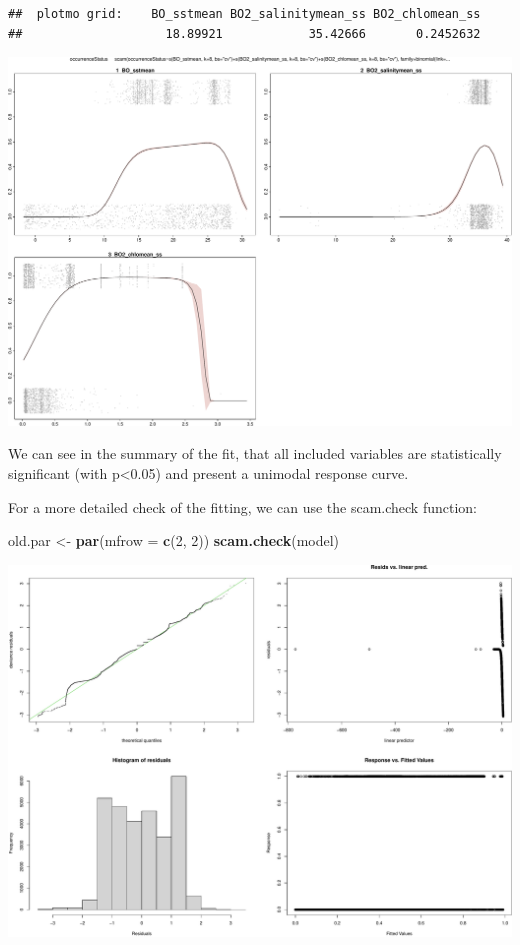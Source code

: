 \documentclass[
]{book}
\newenvironment{Shaded}{\begin{snugshade}}{\end{snugshade}}
\newcommand{\AttributeTok}[1]{\textcolor[rgb]{0.13,0.29,0.53}{#1}}
\newcommand{\DecValTok}[1]{\textcolor[rgb]{0.00,0.00,0.81}{#1}}
\newcommand{\FunctionTok}[1]{\textcolor[rgb]{0.13,0.29,0.53}{\textbf{#1}}}
\newcommand{\NormalTok}[1]{#1}
\newcommand{\OtherTok}[1]{\textcolor[rgb]{0.56,0.35,0.01}{#1}}
\begin{document}
\begin{verbatim}
##  plotmo grid:    BO_sstmean BO2_salinitymean_ss BO2_chlomean_ss
##                    18.89921            35.42666       0.2452632
\end{verbatim}

\includegraphics{_main_files/figure-latex/unnamed-chunk-64-1.pdf}

We can see in the summary of the fit, that all included variables are statistically significant (with p\textless0.05) and present a unimodal response curve.

For a more detailed check of the fitting, we can use the scam.check function:

\begin{Shaded}
\begin{Highlighting}[]
\NormalTok{old.par }\OtherTok{\textless{}{-}} \FunctionTok{par}\NormalTok{(}\AttributeTok{mfrow =} \FunctionTok{c}\NormalTok{(}\DecValTok{2}\NormalTok{, }\DecValTok{2}\NormalTok{))}
\FunctionTok{scam.check}\NormalTok{(model)}
\end{Highlighting}
\end{Shaded}

\includegraphics{_main_files/figure-latex/unnamed-chunk-65-1.pdf}
\end{document}
